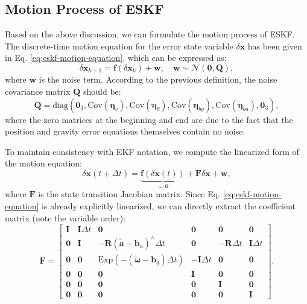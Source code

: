 \subsection{Motion Process of ESKF}
Based on the above discussion, we can formulate the motion process of ESKF. The discrete-time motion equation for the error state variable $\delta \bm{x}$ has been given in Eq. \eqref{eq:eskf-motion-equation}, which can be expressed as:
\begin{equation}\label{eq:eskf-motion-process}
	\delta \bm{x}_{k+1} = \bm{f} (\delta \bm{x}_{k}) + \bm{w}, \quad \bm{w} \sim \mathcal{N}(\bm{0}, \bm{Q}),
\end{equation}
where $\bm{w}$ is the noise term. According to the previous definition, the noise covariance matrix $\bm{Q}$ should be:
\begin{equation}\label{eq:eskf-Q-matrix}
	\bm{Q} = \mathrm{diag}\left(\bm{0}_3, \mathrm{Cov}(\boldsymbol{\eta}_v), \mathrm{Cov}(\boldsymbol{\eta}_{\theta}), \mathrm{Cov}(\boldsymbol{\eta}_{bg}), \mathrm{Cov}(\boldsymbol{\eta}_{ba}), \bm{0}_3\right),
\end{equation}
where the zero matrices at the beginning and end are due to the fact that the position and gravity error equations themselves contain no noise.

To maintain consistency with EKF notation, we compute the linearized form of the motion equation:
\begin{equation}\label{eq:eskf-linearized}
	\delta \bm{x}(t+\Delta t) = \underbrace{\bm{f}(\delta \bm{x}(t))}_{=\bm{0}} + \bm{F} \delta \bm{x} + \bm{w},
\end{equation}
where $\bm{F}$ is the state transition Jacobian matrix. Since Eq. \eqref{eq:eskf-motion-equation} is already explicitly linearized, we can directly extract the coefficient matrix (note the variable order):
\begin{equation}\label{eq:eskf-F-matrix}
	\bm{F} = \begin{bmatrix}
		\bm{I} & \bm{I} \Delta t & \bm{0} & \bm{0} & \bm{0} & \bm{0} \\
		\bm{0} & \bm{I} & - \bm{R}(\tilde{\bm{a}} - \bm{b}_a)^\wedge \Delta t & \bm{0} & -\bm{R} \Delta t & \bm{I} \Delta t \\
		\bm{0} & \bm{0} & \mathrm{Exp}\left( -(\tilde{\boldsymbol{\omega}} - \bm{b}_g) \Delta t \right) &  -\bm{I} \Delta t & \bm{0} & \bm{0} \\
		\bm{0} & \bm{0} & \bm{0} & \bm{I} & \bm{0} & \bm{0} \\
		\bm{0} & \bm{0} & \bm{0} & \bm{0} & \bm{I} & \bm{0} \\
		\bm{0} & \bm{0} & \bm{0} & \bm{0} & \bm{0} & \bm{I} 
	\end{bmatrix}.
\end{equation}

